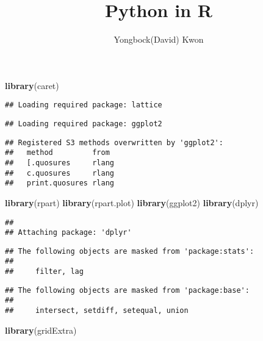 \documentclass[]{article}
\title{Python in R}
\author{Yongbock(David) Kwon}
\date{}
\newenvironment{Shaded}{\begin{snugshade}}{\end{snugshade}}
\newcommand{\KeywordTok}[1]{\textcolor[rgb]{0.13,0.29,0.53}{\textbf{#1}}}
\newcommand{\NormalTok}[1]{#1}
\begin{document}
\maketitle

\begin{Shaded}
\begin{Highlighting}[]
\KeywordTok{library}\NormalTok{(caret)}
\end{Highlighting}
\end{Shaded}

\begin{verbatim}
## Loading required package: lattice
\end{verbatim}

\begin{verbatim}
## Loading required package: ggplot2
\end{verbatim}

\begin{verbatim}
## Registered S3 methods overwritten by 'ggplot2':
##   method         from 
##   [.quosures     rlang
##   c.quosures     rlang
##   print.quosures rlang
\end{verbatim}

\begin{Shaded}
\begin{Highlighting}[]
\KeywordTok{library}\NormalTok{(rpart)}
\KeywordTok{library}\NormalTok{(rpart.plot)}
\KeywordTok{library}\NormalTok{(ggplot2)}
\KeywordTok{library}\NormalTok{(dplyr)}
\end{Highlighting}
\end{Shaded}

\begin{verbatim}
## 
## Attaching package: 'dplyr'
\end{verbatim}

\begin{verbatim}
## The following objects are masked from 'package:stats':
## 
##     filter, lag
\end{verbatim}

\begin{verbatim}
## The following objects are masked from 'package:base':
## 
##     intersect, setdiff, setequal, union
\end{verbatim}

\begin{Shaded}
\begin{Highlighting}[]
\KeywordTok{library}\NormalTok{(gridExtra)}
\end{Highlighting}
\end{Shaded}
\end{document}
